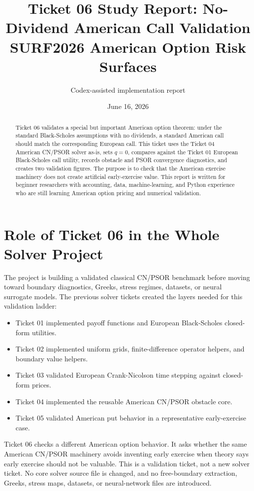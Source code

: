 \documentclass[11pt,a4paper]{article}
\title{\textbf{Ticket 06 Study Report: No-Dividend American Call Validation}\\
\large SURF2026 American Option Risk Surfaces}
\author{Codex-assisted implementation report}
\date{June 16, 2026}
\begin{document}
\maketitle

\begin{abstract}
Ticket 06 validates a special but important American option theorem: under the standard
Black-Scholes assumptions with no dividends, a standard American call should match the
corresponding European call. This ticket uses the Ticket 04 American CN/PSOR solver as-is,
sets \(q=0\), compares against the Ticket 01 European Black-Scholes call utility, records
obstacle and PSOR convergence diagnostics, and creates two validation figures. The purpose is
to check that the American exercise machinery does not create artificial early-exercise value.
This report is written for beginner researchers with accounting, data, machine-learning, and
Python experience who are still learning American option pricing and numerical validation.
\end{abstract}

\tableofcontents
\newpage

\section{Role of Ticket 06 in the Whole Solver Project}

The project is building a validated classical CN/PSOR benchmark before moving toward boundary
diagnostics, Greeks, stress regimes, datasets, or neural surrogate models. The previous solver
tickets created the layers needed for this validation ladder:
\begin{itemize}
  \item Ticket 01 implemented payoff functions and European Black-Scholes closed-form utilities.
  \item Ticket 02 implemented uniform grids, finite-difference operator helpers, and boundary
        value helpers.
  \item Ticket 03 validated European Crank-Nicolson time stepping against closed-form prices.
  \item Ticket 04 implemented the reusable American CN/PSOR obstacle core.
  \item Ticket 05 validated American put behavior in a representative early-exercise case.
\end{itemize}

Ticket 06 checks a different American option behavior. It asks whether the same American
CN/PSOR machinery avoids inventing early exercise when theory says early exercise should not be
valuable. This is a validation ticket, not a new solver ticket. No core solver source file is
changed, and no free-boundary extraction, Greeks, stress maps, datasets, or neural-network files
are introduced.
\end{document}
